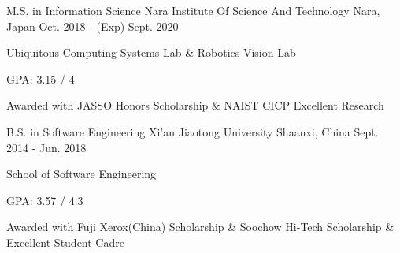 

\begin{cventries}

 \cventry
    {M.S. in Information Science} %
    {Nara Institute Of Science And Technology} %
    {Nara, Japan} %
    {Oct. 2018 - (Exp) Sept. 2020} %
    {
      \begin{cvitems}
      \item {Ubiquitous Computing Systems Lab \& Robotics Vision Lab}
      \item {GPA: 3.15 / 4}
      \item {Awarded with JASSO Honors Scholarship \& NAIST CICP Excellent Research}
      \end{cvitems}
    }
    
 \cventry
    {B.S. in Software Engineering} %
    {Xi'an Jiaotong University} %
    {Shaanxi, China} %
    {Sept. 2014 - Jun. 2018} %
    {
      \begin{cvitems}
      \item {School of Software Engineering}
      \item {GPA: 3.57 / 4.3}
      \item {Awarded with Fuji Xerox(China) Scholarship \& Soochow Hi-Tech Scholarship \& Excellent Student Cadre}%
      \end{cvitems}
    }

\end{cventries}

